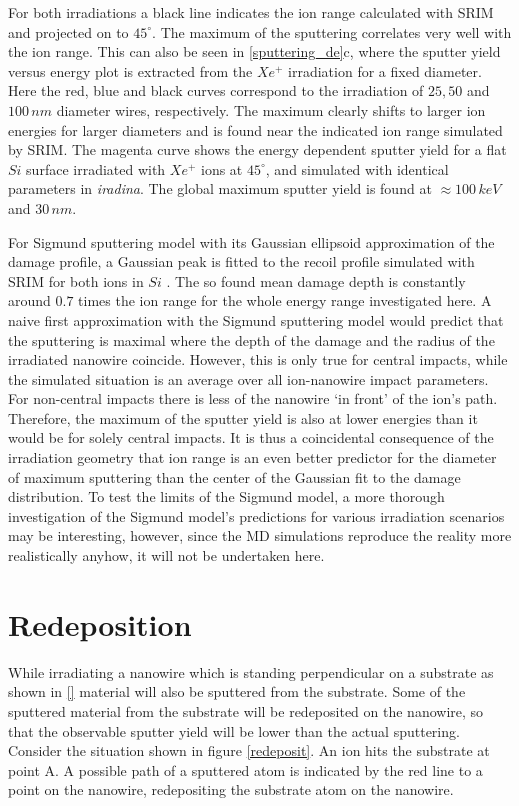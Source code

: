 For both irradiations a black line indicates the ion range calculated with SRIM and projected on to $45^\circ$. The maximum of the sputtering correlates very well with the ion range. This can also be seen in \ref{sputtering_de}c, where the sputter yield versus energy plot is extracted from the $Xe^+$ irradiation for a fixed diameter. Here the red, blue and black curves correspond to the irradiation of $25, 50$ and $100\,nm$ diameter wires, respectively. The maximum clearly shifts to larger ion energies for larger diameters and is found near the indicated ion range simulated by SRIM. The magenta curve shows the energy dependent sputter yield for a flat $Si$ surface irradiated with $Xe^+$ ions at $45^\circ$, and simulated with identical parameters in \emph{iradina}. The global maximum sputter yield is found at $\approx 100 \,keV$ and $30\,nm$. 

For Sigmund sputtering model with its Gaussian ellipsoid approximation of the damage profile, a Gaussian peak is fitted to the recoil profile simulated with SRIM for both ions in $Si$ \cite{bobes_ion_2012}. The so found mean damage depth is constantly around $0.7$ times the ion range for the whole energy range investigated here. A naive first approximation with the Sigmund sputtering model would predict that the sputtering is maximal where the depth of the damage and the radius of the irradiated nanowire coincide. However, this is only true for central impacts, while the simulated situation is an average over all ion-nanowire impact parameters. For non-central impacts there is less of the nanowire `in front' of the ion's path. Therefore, the maximum of the sputter yield is also at lower energies than it would be for solely central impacts. It is thus a coincidental consequence of the irradiation geometry that ion range is an even better predictor for the diameter of maximum sputtering than the center of the Gaussian fit to the damage distribution. To test the limits of the Sigmund model, a more thorough investigation of the Sigmund model's predictions for various irradiation scenarios may be interesting, however, since the MD simulations reproduce the reality more realistically anyhow, it will not be undertaken here.



\section{Redeposition}
\label{sec:redeposition}

While irradiating a nanowire which is standing perpendicular on a substrate as shown in \ref{} material will also be sputtered from the substrate. Some of the sputtered material from the substrate will be redeposited on the nanowire, so that the observable sputter yield will be lower than the actual sputtering. Consider the situation shown in figure \ref{redeposit}. An ion hits the substrate at point A. A possible path of a sputtered atom is indicated by the red line to a point on the nanowire, redepositing the substrate atom on the nanowire. 

